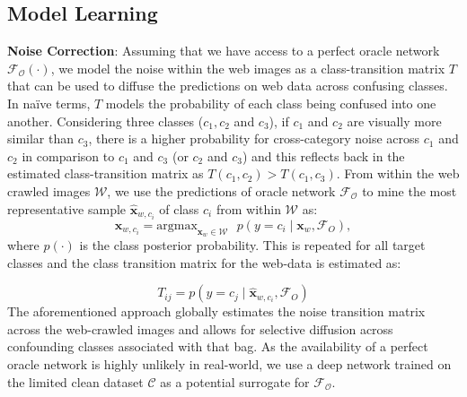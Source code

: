 \documentclass{llncs}
\begin{document}
\subsection{Model Learning}

\noindent
\textbf{Noise Correction}: Assuming that we have access to a perfect oracle network $\mathcal{F}_{\mathcal{O}}\left ( \cdot \right )$, we model the noise within the web images as a class-transition matrix $T$ that can be used to diffuse the predictions on web data across confusing classes. In na\"{i}ve terms, $T$ models the probability of each class being confused into one another. Considering three classes ($c_{1},c_{2}$ and $c_{3}$), if $c_{1}$ and $c_{2}$ are visually more similar than $c_{3}$, there is a higher probability for cross-category noise across $c_{1}$ and $c_{2}$ in comparison to $c_{1}$ and $c_{3}$ (or $c_{2}$ and $c_{3}$) and this reflects back in the estimated class-transition matrix as $T\left (c_{1},c_{2}  \right ) > T\left (c_{1},c_{3}  \right )$. From within the web crawled images $\mathcal{W}$, we use the predictions of oracle network  $\mathcal{F}_{\mathcal{O}}$ to mine the most representative sample $\hat{\mathbf{x}}_{w,c_{i}}$ of class $c_{i}$ from within $\mathcal{W}$ as: 
\begin{equation}
\hat{\mathbf{x}}_{w,c_{i}} = \text{argmax}_{\mathbf{x}_{w} \in \mathcal{W}}\text{ } p\left ( y = c_{i} \mid \mathbf{x}_{w}, \mathcal{F}_{O} \right ),
\end{equation}
where $p\left ( \cdot \right )$ is the class posterior probability. This is repeated for all target classes and the class transition matrix for the web-data is estimated as: 

\begin{equation}
T_{ij} = p\left ( y = c_{j} \mid \hat{\mathbf{x}}_{w,c_{i}}, \mathcal{F}_{O} \right )
\end{equation}
The aforementioned approach globally estimates the noise transition matrix across the web-crawled images and allows for selective diffusion across confounding classes associated with that bag. As the availability of a perfect oracle network is highly unlikely in real-world, we use a deep network trained on the limited clean dataset $\mathcal{C}$ as a potential surrogate for $\mathcal{F}_{\mathcal{O}}$. 
\end{document}
